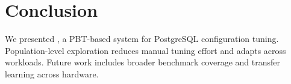 \section{Conclusion}
We presented \sysname, a PBT-based system for PostgreSQL configuration tuning.
Population-level exploration reduces manual tuning effort and adapts across workloads.
Future work includes broader benchmark coverage and transfer learning across hardware.
